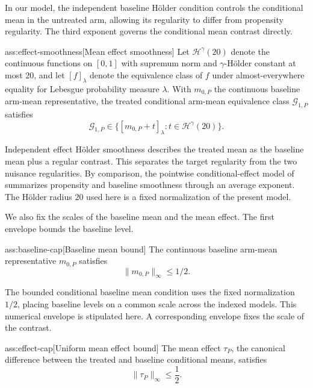 \documentclass[11pt]{article}
\begin{document}
In our model, the independent baseline Hölder condition controls the conditional mean in the untreated arm, allowing its regularity to differ from propensity regularity. The third exponent governs the conditional mean contrast directly.

\begin{assumptionv}{ass:effect-smoothness}[Mean effect smoothness]
Let \(\mathcal H^\gamma(20)\) denote the continuous functions on \([0,1]\) with supremum norm and \(\gamma\)-Hölder constant at most \(20\), and let \([f]_\lambda\) denote the equivalence class of \(f\) under almost-everywhere equality for Lebesgue probability measure \(\lambda\). With \(m_{0,P}\) the continuous baseline arm-mean representative, the treated conditional arm-mean equivalence class \(\mathcal G_{1,P}\) satisfies
\[
\mathcal G_{1,P}\in\{[m_{0,P}+t]_\lambda:t\in\mathcal H^\gamma(20)\}.
\]
\end{assumptionv}

Independent effect Hölder smoothness describes the treated mean as the baseline mean plus a regular contrast. This separates the target regularity from the two nuisance regularities. By comparison, the pointwise conditional-effect model of \citet[Sections 2--3]{KennedyBalakrishnanRobinsWasserman2024MinimaxCATE} summarizes propensity and baseline smoothness through an average exponent. The Hölder radius \(20\) used here is a fixed normalization of the present model.

We also fix the scales of the baseline mean and the mean effect. The first envelope bounds the baseline level.

\begin{assumptionv}{ass:baseline-cap}[Baseline mean bound]
The continuous baseline arm-mean representative \(m_{0,P}\) satisfies
\[
\|m_{0,P}\|_\infty\le1/2.
\]
\end{assumptionv}

The bounded conditional baseline mean condition uses the fixed normalization \(1/2\), placing baseline levels on a common scale across the indexed models. This numerical envelope is stipulated here. A corresponding envelope fixes the scale of the contrast.

\begin{assumptionv}{ass:effect-cap}[Uniform mean effect bound]
The mean effect \(\tau_P\), the canonical difference between the treated and baseline conditional means, satisfies
\[
\|\tau_P\|_\infty\le \frac12.
\]
\end{assumptionv}
\end{document}
